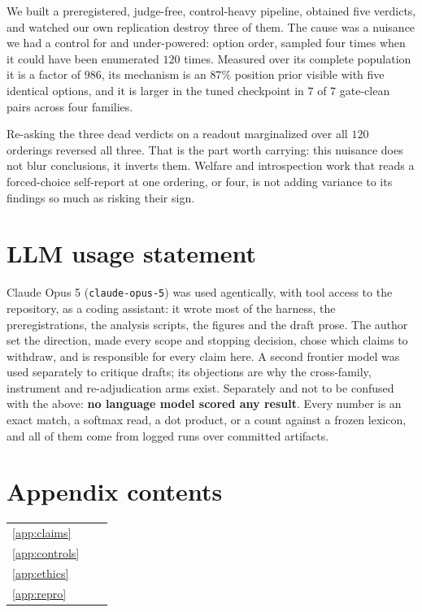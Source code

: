 \documentclass{article}
\begin{document}
We built a preregistered, judge-free, control-heavy pipeline, obtained five verdicts, and watched
our own replication destroy three of them. The cause was a nuisance we had a control for and
under-powered: option order, sampled four times when it could have been enumerated $120$ times.
Measured over its complete population it is a factor of $986$, its mechanism is an $87\%$ position
prior visible with five identical options, and it is larger in the tuned checkpoint in $7$ of $7$
gate-clean pairs across four families.

Re-asking the three dead verdicts on a readout marginalized over all $120$ orderings reversed all
three. That is the part worth carrying: this nuisance does not blur conclusions, it inverts them.
Welfare and introspection work that reads a forced-choice self-report at one ordering, or four, is
not adding variance to its findings so much as risking their sign.

\section*{LLM usage statement}
\label{sec:llm}

Claude Opus 5 (\texttt{claude-opus-5}) was used agentically, with tool access to the repository, as
a coding assistant: it wrote most of the harness, the preregistrations, the analysis scripts, the
figures and the draft prose. The author set the direction, made every scope and stopping decision,
chose which claims to withdraw, and is responsible for every claim here. A second frontier model was
used separately to critique drafts; its objections are why the cross-family, instrument and
re-adjudication arms exist. Separately and not to be confused with the above: \textbf{no language
model scored any result}. Every number is an exact match, a softmax read, a dot product, or a count
against a frozen lexicon, and all of them come from logged runs over committed artifacts.

\setlength{\bibsep}{2.5pt plus 0.4ex}




\appendix
\clearpage

\section*{Appendix contents}
\noindent\begin{tabular}{@{}p{0.7cm}p{} r@{}}
\ref{app:claims}   & \nameref{app:claims}   & \pageref{app:claims} \\
\ref{app:controls} & \nameref{app:controls} & \pageref{app:controls} \\
\ref{app:ethics}   & \nameref{app:ethics}   & \pageref{app:ethics} \\
\ref{app:repro}    & \nameref{app:repro}    & \pageref{app:repro} \\
\end{tabular}
\end{document}
